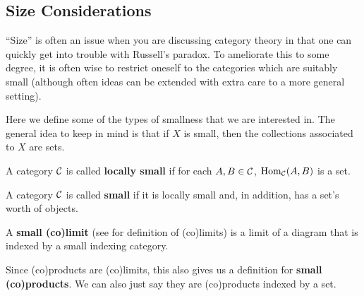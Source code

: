 \documentclass[12pt]{article}
\begin{document}
\subsection{Size Considerations}
``Size'' is often an issue when you are discussing category theory in that one can quickly get into trouble with Russell's paradox.
To ameliorate this to some degree, it is often wise to restrict oneself to the categories which are suitably small (although often 
ideas can be extended with extra care to a more general setting).

Here we define some of the types of smallness that we are interested in. The general idea to keep in mind is that if $X$ is small, then the 
collections associated to $X$ are sets.

\begin{defn}
	A category $\mathcal{C}$ is called \textbf{locally small} if for each $A,B\in\mathcal{C}$, $\operatorname{Hom}_{\mathcal{C}}(A,B)$ is a set.
\end{defn}
\begin{defn}
	A category $\mathcal{C}$ is called \textbf{small} if it is locally small and, in addition, has a set's worth of objects.
\end{defn}
\begin{defn}
	A \textbf{small (co)limit} (see \cite{riehl} for definition of (co)limits) is a limit of a diagram that is indexed by a small indexing category.
\end{defn}
\begin{rmk}
	Since (co)products are (co)limits, this also gives us a definition for \textbf{small (co)products}. We can also just say 
	they are (co)products indexed by a set.
\end{rmk}
\end{document}
